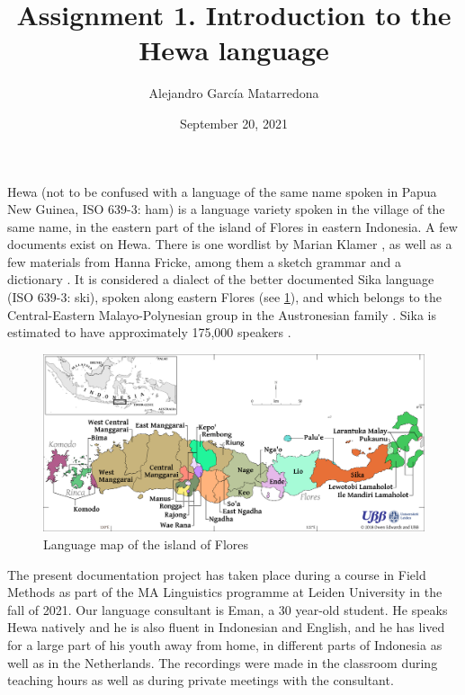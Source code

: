 \documentclass[class=article, crop=false]{standalone}
\author{Alejandro García Matarredona}
\title{Assignment 1. Introduction to the Hewa language}
\date{September 20, 2021}
\begin{document}
\ifstandalone
\maketitle
\fi



Hewa (not to be confused with a language of the same name spoken in Papua New Guinea, ISO 639-3: ham) is a language variety spoken in the village of the same name, in the eastern part of the island of Flores in eastern Indonesia. A few documents exist on Hewa. There is one wordlist by Marian Klamer \citep{klamer_2015}, as well as a few materials from Hanna Fricke, among them a sketch grammar \citep{Fricke2014} and a dictionary \citep{fricke_2015}. It is considered a dialect of the better documented Sika language (ISO 639-3: ski), spoken along eastern Flores (see \cref{fig:langmap}), and which belongs to the Central-Eastern Malayo-Polynesian group in the Austronesian family \citep{Lewis1995}. Sika is estimated to have approximately 175,000 speakers \citep{Lewis1995}.


\begin{figure}[h]

\includegraphics[width=0.9\linewidth] {Images/flores_languages__inset_.png}

\caption{Language map of the island of Flores \citep{edwards_ubb_2018}}
\label{fig:langmap}
\end{figure}


The present documentation project has taken place during a course in Field Methods as part of the MA Linguistics programme at Leiden University in the fall of 2021. Our language consultant is Eman, a 30 year-old student. He speaks Hewa natively and he is also fluent in Indonesian and English, and he has lived for a large part of his youth away from home, in different parts of Indonesia as well as in the Netherlands. The recordings were made in the classroom during teaching hours as well as during private meetings with the consultant.



\ifstandalone
\printbibliography
\fi
\end{document}
